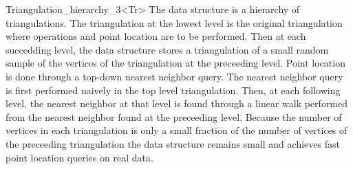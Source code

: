 \begin{ccRefClass}{Triangulation_hierarchy_3<Tr>}
\ccImplementation
The data structure is a hierarchy 
of triangulations. The triangulation at the lowest level is
the original triangulation where operations and point location are to 
be performed.
Then at each succedding level, the data structure
stores a triangulation of a small random sample of the vertices
of the triangulation at the preceeding level. Point location
is done through a top-down nearest neighbor query.
The nearest neighbor query is first
performed naively in the top level triangulation.
Then, at each following level, the nearest neighbor at that level
is found through a linear walk performed from
the nearest neighbor found at the preceeding level.
Because the number of vertices in each triangulation is only a small
fraction of the number of vertices of the preceeding triangulation 
the data structure remains small and achieves fast point location 
queries on real
data. 

\ccSeeAlso
{}\\

\end{ccRefClass}

